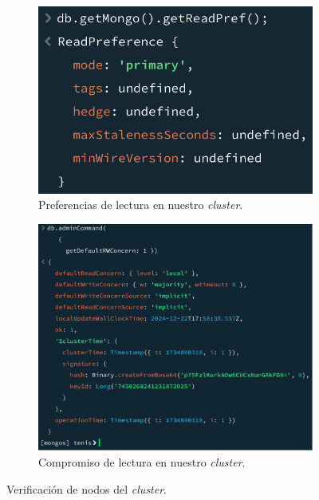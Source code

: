 \begin{figure}[H]
     \centering
     \begin{subfigure}[b]{0.45\textwidth}
        \centering
        \includegraphics[width=\textwidth]{fotos/mongo/read_pref_default.png}
        \caption{Preferencias de lectura en nuestro \textit{cluster}.}
     \end{subfigure}
     \hfill
     \begin{subfigure}[b]{0.45\textwidth}
        \centering
        \includegraphics[width=\textwidth]{fotos/mongo/Picture 1.png}
        \caption{Compromiso de lectura en nuestro \textit{cluster}.}
     \end{subfigure}
\caption{Verificación de nodos del \textit{cluster}.}
\label{fig:comprobarpermisos}
\end{figure}

